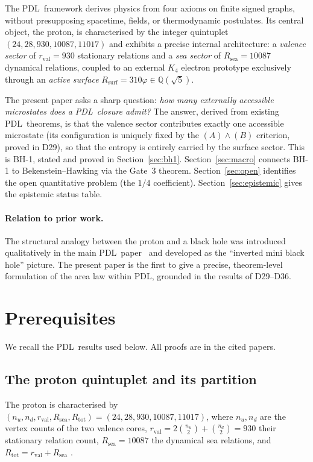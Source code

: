\documentclass[11pt,a4paper]{article}
\theoremstyle{plain}
\theoremstyle{definition}
\theoremstyle{remark}
\newcommand{\PDL}{\textsc{PDL}}
\newcommand{\Kfour}{K_4}
\newcommand{\rval}{r_{\mathrm{val}}}
\newcommand{\Rsea}{R_{\mathrm{sea}}}
\newcommand{\Rtot}{R_{\mathrm{tot}}}
\newcommand{\Rsurf}{R_{\mathrm{surf}}}
\newcommand{\vp}{\varphi}
\begin{document}
The \PDL\ framework derives physics from four axioms on finite signed graphs, without
presupposing spacetime, fields, or thermodynamic postulates. Its central object, the
proton, is characterised by the integer quintuplet $(24,28,930,10087,11017)$ and
exhibits a precise internal architecture: a \emph{valence sector} of $\rval=930$
stationary relations and a \emph{sea sector} of $\Rsea=10087$ dynamical relations,
coupled to an external $\Kfour$ electron prototype exclusively through an \emph{active
surface} $\Rsurf = 310\vp \in \mathbb{Q}(\sqrt{5})$.

The present paper asks a sharp question: \emph{how many externally accessible
microstates does a \PDL\ closure admit?} The answer, derived from existing \PDL\
theorems, is that the valence sector contributes exactly one accessible microstate
(its configuration is uniquely fixed by the $(A)\wedge(B)$ criterion, proved in D29),
so that the entropy is entirely carried by the surface sector. This is BH-1, stated
and proved in Section~\ref{sec:bh1}. Section~\ref{sec:macro} connects BH-1 to
Bekenstein--Hawking via the Gate~3 theorem. Section~\ref{sec:open} identifies the
open quantitative problem (the $1/4$ coefficient). Section~\ref{sec:epistemic} gives
the epistemic status table.

\paragraph{Relation to prior work.}
The structural analogy between the proton and a black hole was introduced qualitatively
in the main \PDL\ paper~\cite{PDL_Main_2026} and developed as the ``inverted mini
black hole'' picture. The present paper is the first to give a precise, theorem-level
formulation of the area law within \PDL, grounded in the results of D29--D36.

\section{Prerequisites}
\label{sec:prereq}

We recall the \PDL\ results used below. All proofs are in the cited papers.

\subsection{The proton quintuplet and its partition}

The proton is characterised by
$(n_u, n_d, \rval, \Rsea, \Rtot) = (24, 28, 930, 10087, 11017)$,
where $n_u, n_d$ are the vertex counts of the two valence cores,
$\rval = 2\binom{n_u}{2} + \binom{n_d}{2} = 930$ their stationary relation count,
$\Rsea = 10087$ the dynamical sea relations, and $\Rtot = \rval + \Rsea$
\cite{PDL_Main_2026,Combinatorial_Proton_PDL_2026}.
\end{document}
